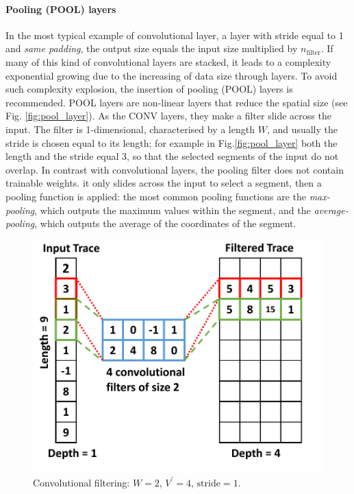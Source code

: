 \paragraph*{Pooling (POOL) layers} 
In the most typical example of convolutional layer, \ie a layer with stride equal to 1 and \emph{same padding}, the output size equals the input size multiplied by $n_{\text{filter}}$. If many of this kind of convolutional layers are stacked, it leads to a complexity exponential growing due to the increasing of data size through layers. To avoid such complexity explosion, the insertion of pooling (POOL) layers is recommended.  POOL layers 
are non-linear layers that reduce the spatial size (see Fig. \ref{fig:pool_layer}). As the CONV layers, they make a filter slide across the input. The filter is 1-dimensional, characterised by a length $W$, and usually the stride is chosen equal to its length; for example in Fig.\ref{fig:pool_layer} both the length and the stride equal 3, so that the selected segments of the input do not overlap. In contrast with convolutional layers, the pooling filter does not contain trainable weights. it only slides across the input to select a segment, then a pooling function is applied: the most common pooling functions are the \emph{max-pooling}, which outputs the maximum values within the segment, and the \emph{average-pooling}, which outputs the average of the coordinates of the segment. 


\begin{figure}[t]
\centering
\includegraphics[width=.4\textwidth]{../Figures/CHES2017/conv_filt.pdf}
\caption{Convolutional filtering: $W=2$, $V^{\prime}=4$, $\mathrm{stride}=1$. }\label{fig:conv_layer}
\end{figure}

